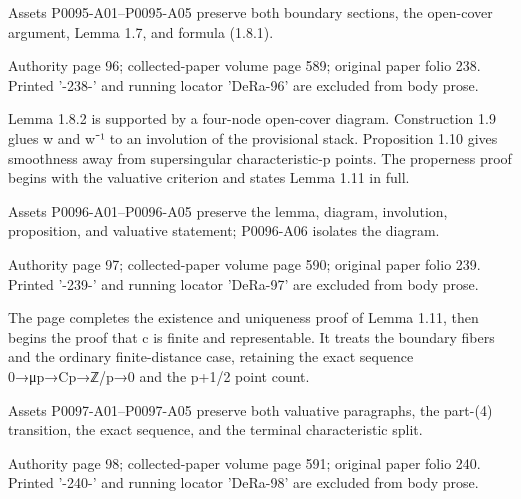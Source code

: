 \documentclass[11pt,a4paper]{article}
\begin{document}
Assets P0095-A01--P0095-A05 preserve both boundary sections, the open-cover argument, Lemma 1.7, and formula (1.8.1).


\par\medskip
\hypertarget{D018-P0096}{}
\par\smallskip
Authority page 96; collected-paper volume page 589; original paper folio 238. Printed '-238-' and running locator 'DeRa-96' are excluded from body prose.

Lemma 1.8.2 is supported by a four-node open-cover diagram. Construction 1.9 glues w and w⁻¹ to an involution of the provisional stack. Proposition 1.10 gives smoothness away from supersingular characteristic-p points. The properness proof begins with the valuative criterion and states Lemma 1.11 in full.

Assets P0096-A01--P0096-A05 preserve the lemma, diagram, involution, proposition, and valuative statement; P0096-A06 isolates the diagram.


\par\medskip
\hypertarget{D018-P0097}{}
\par\smallskip
Authority page 97; collected-paper volume page 590; original paper folio 239. Printed '-239-' and running locator 'DeRa-97' are excluded from body prose.

The page completes the existence and uniqueness proof of Lemma 1.11, then begins the proof that c is finite and representable. It treats the boundary fibers and the ordinary finite-distance case, retaining the exact sequence 0→μ\textunderscore{}p→C\textunderscore{}p→ℤ/p→0 and the p+1/2 point count.

Assets P0097-A01--P0097-A05 preserve both valuative paragraphs, the part-(4) transition, the exact sequence, and the terminal characteristic split.


\par\medskip
\hypertarget{D018-P0098}{}
\par\smallskip
Authority page 98; collected-paper volume page 591; original paper folio 240. Printed '-240-' and running locator 'DeRa-98' are excluded from body prose.
\end{document}
